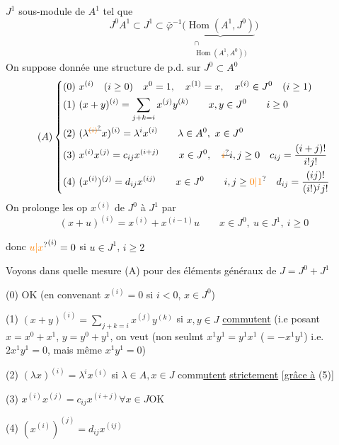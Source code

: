 $J^1$  sous-module de $A^1$ tel que
\[
J^0 A^1\subset J^1\subset\bar\varphi^{-1}\bigl(\underset{\substack{\cap\\\operatorname{Hom}(A^1,A^0))}}{\underbrace{\operatorname{Hom}(A^1,J^0)}}\bigr)
\]
On suppose donnée une structure de p.d. sur $J^0\subset A^0$
\[
(A)\left\{\begin{aligned}
(0)\ &x^{(i)}\quad(i\geq0)\quad x^0=1,\quad x^{(1)}=x,\quad x^{(i)}\in J^0\quad(i\geq1)\\
(1)\ &(x+y)^{(i)}=\sum_{j+k=i}x^{(j)}y^{(k)}\qquad x,y\in J^0\qquad i\geq0\\
(2)\ &(\lambda^{\deleted{\unsure{(i)}}}x)^{(i)}=\lambda^i x^{(i)}\qquad\lambda\in A^0,\ x\in J^0\\
(3)\ &x^{(i)}x^{(j)}=c_{ij}x^{(i+j)}\qquad x\in J^0,\quad\deleted{\unsure{i}}i,j\geq0\quad c_{ij}=\frac{(i+j)!}{i!j!}\\
(4)\ &(x^{(i)})^{(j)}=d_{ij}x^{(ij)}\qquad x\in J^0\qquad i,j\geq\unsure{0|1}\quad d_{ij}=\frac{(ij)!}{(i!)^j j!}
\end{aligned}\right.
\]
On prolonge les op $x^{(i)}$ de $J^0$ à  $J^1$ par
\[
(x+u)^{(i)}=x^{(i)}+x^{(i-1)}u\qquad x\in J^0,\ u\in J^1,\ i\geq0\tag*{($\ast$)}
\]

donc $\unsure{u|x}^{(i)}=0$ si $u\in J^1$, $i\geq2$

Voyons dans quelle mesure (A)  pour des éléments généraux de $J=J^0+J^1$

(0) OK (en convenant $x^{(i)}=0$ si $i<0$, $x\in J^0$) 

(1) $\displaystyle(x+y)^{(i)}=\sum_{j+k=i}x^{(j)}y^{(k)}$ si $x,y\in J$ \uline{commutent} 
 (i.e posant $x=x^0+x^1$, $y=y^0+y^1$, on veut (non seulmt $x^1y^1=y^1x^1$  ($=-x^1y^1$) i.e. $2x^1y^1=0$, mais même $x^1y^1=0$)

(2) $(\lambda x)^{(i)}=\lambda^i x^{(i)}$ si $\lambda\in A,x\in J$ comm\uline{utent} \uline{strictement} [\uline{grâce à} (5)]

(3)  $x^{(i)}x^{(j)}=c_{ij}x^{(i+j)}$\qquad $\forall x\in J$\quad OK

(4) $(x^{(i)})^{(j)}=d_{ij}x^{(ij)}$

